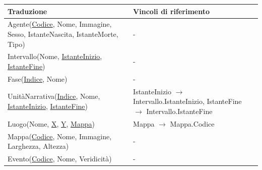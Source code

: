 \documentclass{article}
\begin{document}
\begin{center}\begin{tabular}{|p{}|p{}|}
		\hline
		\textbf{Traduzione}                                                                                  & \textbf{Vincoli di riferimento}                                                                                                                                                \\
		\hline
		Agente(\underline{Codice}, Nome, Immagine, Sesso, IstanteNascita, IstanteMorte, Tipo)                & -                                                                                                                                                                              \\
		\hline
		Intervallo(Nome, \underline{IstanteInizio}, \underline{IstanteFine})                                 & -                                                                                                                                                                              \\
		\hline
		Fase(\underline{Indice}, Nome)                                                                       & -                                                                                                                                                                              \\
		\hline
		UnitàNarrativa(\underline{Indice}, Nome, \underline{IstanteInizio}, \underline{IstanteFine})         & IstanteInizio $\rightarrow$ Intervallo.IstanteInizio, IstanteFine $\rightarrow$ Intervallo.IstanteFine                                                                         \\
		\hline
		Luogo(Nome, \underline{X}, \underline{Y}, \underline{Mappa})                                         & Mappa $\rightarrow$ Mappa.Codice                                                                                                                                               \\
		\hline
		Mappa(\underline{Codice}, Nome, Immagine, Larghezza, Altezza)                                        & -                                                                                                                                                                              \\
		\hline
		Evento(\underline{Codice}, Nome, Veridicità)                                                         & -                                                                                                                                                                              \\

\end{tabular}
\end{center}
\end{document}
